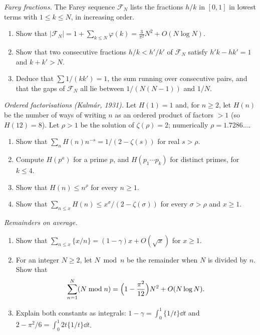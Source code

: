 \begin{exercise}[$\star\star$]\label{pb:farey}
\emph{Farey fractions.} The Farey sequence $\mathcal F_N$ lists the fractions $h/k$ in $[0,1]$ in lowest terms with $1\le k\le N$, in increasing order.
\begin{enumerate}[label=(\alph*)]
\item Show that $|\mathcal F_N|=1+\sum_{k\le N}\varphi(k)=\frac3{\pi^2}N^2+O(N\log N)$.
\item Show that two consecutive fractions $h/k<h'/k'$ of $\mathcal F_N$ satisfy $h'k-hk'=1$ and $k+k'>N$.
\item Deduce that $\sum 1/(kk')=1$, the sum running over consecutive pairs, and that the gaps of $\mathcal F_N$ all lie between $1/(N(N-1))$ and $1/N$.
\end{enumerate}
\end{exercise}

\begin{exercise}[$\star\star$]\label{pb:orderedfact}
\emph{Ordered factorisations (Kalm\'ar, 1931).} Let $H(1)=1$ and, for $n\ge2$, let $H(n)$ be the number of ways of writing $n$ as an ordered product of factors $>1$ (so $H(12)=8$). Let $\rho>1$ be the solution of $\zeta(\rho)=2$; numerically $\rho=1.7286\ldots$.
\begin{enumerate}[label=(\alph*)]
\item Show that $\sum_n H(n)n^{-s}=1/(2-\zeta(s))$ for real $s>\rho$.
\item Compute $H(p^a)$ for a prime $p$, and $H(p_1\cdots p_k)$ for distinct primes, for $k\le4$.
\item Show that $H(n)\le n^\rho$ for every $n\ge1$.
\item Show that $\sum_{n\le x}H(n)\le x^\sigma/(2-\zeta(\sigma))$ for every $\sigma>\rho$ and $x\ge1$.
\end{enumerate}
\end{exercise}

\begin{exercise}[$\star\star$]\label{pb:fracmean}
\emph{Remainders on average.}
\begin{enumerate}[label=(\alph*)]
\item Show that $\displaystyle\sum_{n\le x}\bigl\{x/n\bigr\}=(1-\gamma)x+O(\sqrt x)$ for $x\ge1$.
\item For an integer $N\ge2$, let $N\bmod n$ be the remainder when $N$ is divided by $n$. Show that
\[
\sum_{n=1}^N(N\bmod n)=\Bigl(1-\frac{\pi^2}{12}\Bigr)N^2+O(N\log N).
\]
\item Explain both constants as integrals: $1-\gamma=\int_0^1\{1/t\}\dd t$ and $2-\pi^2/6=\int_0^1 2t\{1/t\}\dd t$.
\end{enumerate}
\end{exercise}

